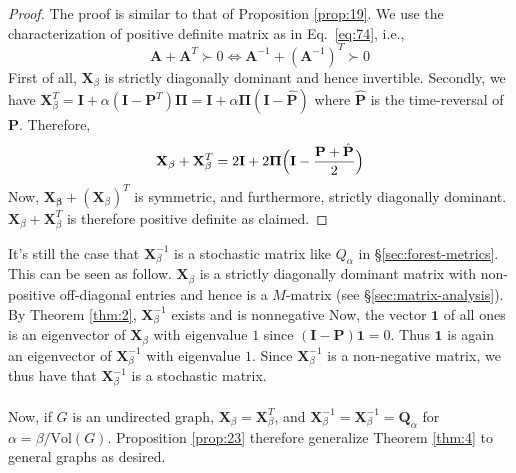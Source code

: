 \begin{proof}
The proof is similar to that of Proposition \ref{prop:19}. 
We use the
characterization of positive definite matrix as in Eq.~\eqref{eq:74},
i.e., 
\begin{equation*}
    \mathbf{A} + \mathbf{A}^{T} \succ 0 \Leftrightarrow
    \mathbf{A}^{-1} + (\mathbf{A}^{-1})^{T} \succ 0
\end{equation*}
First of all, $\mathbf{X}_{\beta}$ is strictly diagonally dominant
and hence invertible. Secondly, we have $\mathbf{X}_{\beta}^{T} =
\mathbf{I} + \alpha (\mathbf{I} - \mathbf{P}^{T}) \bm{\Pi} =
\mathbf{I} + \alpha \bm{\Pi} (\mathbf{I} - \hat{\mathbf{P}})$ where
$\hat{\mathbf{P}}$ is the time-reversal of $\mathbf{P}$. Therefore, 
\begin{equation}
  \label{eq:82}
  \mathbf{X}_{\beta} + \mathbf{X}_{\beta}^{T} = 2 \mathbf{I}
  + 2 \bm{\Pi}\Bigl(\mathbf{I} - \frac{\mathbf{P} + \hat{\mathbf{P}}}{2}
  \Bigr)
\end{equation}
Now, $\mathbf{X_{\beta}} + (\mathbf{X}_{\beta})^{T}$ is symmetric, and
furthermore, strictly diagonally dominant. $\mathbf{X}_\beta +
\mathbf{X}_{\beta}^{T}$ is therefore positive definite as claimed.  
\end{proof}
It's still the case that $\mathbf{X}_{\beta}^{-1}$ is a stochastic
matrix like $Q_{\alpha}$ in \S \ref{sec:forest-metrics}. This can be
seen as follow. $\mathbf{X}_{\beta}$ is a strictly diagonally dominant
matrix with non-positive off-diagonal entries and hence is a
$M$-matrix (see \S \ref{sec:matrix-analysis}). By Theorem \ref{thm:2},
$\mathbf{X}_{\beta}^{-1}$ exists and is nonnegative Now, the vector
$\bm{1}$ of all ones is an eigenvector of $\mathbf{X}_{\beta}$ with
eigenvalue $1$ since $(\mathbf{I} - \mathbf{P})\bm{1} = 0$. Thus
$\bm{1}$ is again an eigenvector of $\mathbf{X}_{\beta}^{-1}$ with
eigenvalue $1$. Since $\mathbf{X}_{\beta}^{-1}$ is a non-negative
matrix, we thus have that $\mathbf{X}_{\beta}^{-1}$ is a stochastic
matrix. \\ \\
%
%
Now, if $G$ is an undirected graph, $\mathbf{X}_{\beta} =
\mathbf{X}_{\beta}^{T}$, and $\mathbf{X}_{\beta}^{-1} =
\mathbf{X}_{\beta}^{-1} = \mathbf{Q}_{\alpha}$ for $\alpha =
\beta/\mathrm{Vol}(G)$. Proposition \ref{prop:23} therefore generalize
Theorem \ref{thm:4} to general graphs as desired.

